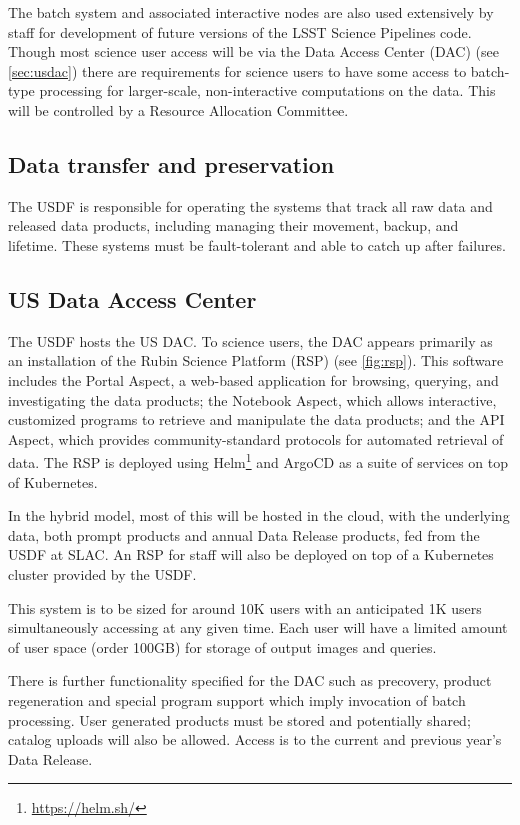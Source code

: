 The batch system and associated interactive nodes are also used extensively by staff for development of future versions of the LSST Science Pipelines code.\cite{2019ASPC..523..521B}
Though most science user access will be via the Data Access Center (DAC) (see \autoref{sec:usdac})
there are requirements for science users to have some access to batch-type processing for larger-scale, non-interactive computations on the data.\cite{DMTN-223}
This will be controlled by a Resource Allocation Committee.

\subsection{Data transfer and preservation} \label{req:dbb}
The USDF is responsible for operating the systems that track all raw data and released data products, including managing their movement, backup, and lifetime.
These systems must be fault-tolerant and able to catch up after failures.

\subsection{US Data Access Center}\label{sec:usdac}
The USDF hosts the US DAC.
To science users, the DAC appears primarily as an installation of the Rubin Science Platform (RSP)\cite{LDM-542} (see \autoref{fig:rsp}).
This software includes the Portal Aspect, a web-based application for browsing, querying, and investigating the data products; the Notebook Aspect, which allows interactive, customized programs to retrieve and manipulate the data products; and the API Aspect, which provides community-standard protocols for automated retrieval of data.
The RSP is deployed using Helm\footnote{\url{https://helm.sh/}} and ArgoCD as a suite of services on top of Kubernetes.

In the hybrid model, most of this will be hosted in the cloud, with the underlying data, both prompt products and annual Data Release products, fed from the USDF at SLAC.
An RSP for staff will also be deployed on top of a Kubernetes cluster provided by the USDF.

This system is to be sized for around 10K users with an anticipated 1K users simultaneously accessing at any given time.
Each user will have a limited amount of user space (order 100GB) for storage of output images and queries.

There is further functionality specified for the DAC such as precovery, product regeneration and special program support which imply invocation
of batch processing.
User generated products must be stored and potentially shared; catalog uploads will also be allowed.
Access is to the current and previous year's Data Release.
